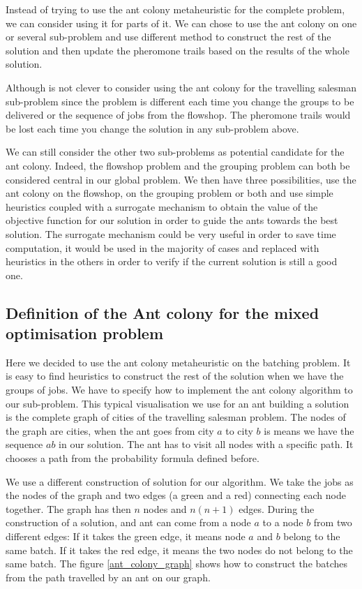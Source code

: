 \documentclass[UTF8, twoside]{EPURapport}
\begin{document}
	Instead of trying to use the ant colony metaheuristic for the complete problem, we can consider using it for parts of it. We can chose to use the ant colony on one or several sub-problem and use different method to construct the rest of the solution and then update the pheromone trails based on the results of the whole solution.
	
	Although is not clever to consider using the ant colony for the travelling salesman sub-problem since the problem is different each time you change the groups to be delivered or the sequence of jobs from the flowshop. The pheromone trails would be lost each time you change the solution in any sub-problem above.
	
	We can still consider the other two sub-problems as potential candidate for the ant colony. Indeed, the flowshop problem and the grouping problem can both be considered central in our global problem. We then have three possibilities, use the ant colony on the flowshop, on the grouping problem or both and use simple heuristics coupled with a surrogate mechanism to obtain the value of the objective function for our solution in order to guide the ants towards the best solution. The surrogate mechanism could be very useful in order to save time computation, it would be used in the majority of cases and replaced with heuristics in the others in order to verify if the current solution is still a good one.
\\	

\subsection{Definition of the Ant colony for the mixed optimisation problem}
	
	\hspace{4ex}Here we decided to use the ant colony metaheuristic on the batching problem. It is easy to find heuristics to construct the rest of the solution when we have the groups of jobs. We have to specify how to implement the ant colony algorithm to our sub-problem. This typical visualisation we use for an ant building a solution is the complete graph of cities of the travelling salesman problem. The nodes of the graph are cities, when the ant goes from city $a$ to city $b$ is means we have the sequence $ab$ in our solution. The ant has to visit all nodes with a specific path. It chooses a path from the probability formula defined before.
	
	We use a different construction of solution for our algorithm. We take the jobs as the nodes of the graph and two edges (a green and a red) connecting each node together. The graph has then $n$ nodes and $n(n+1)$ edges. During the construction of a solution, and ant can come from a node $a$ to a node $b$ from two different edges: If it takes the green edge, it means node $a$ and $b$ belong to the same batch. If it takes the red edge, it means the two nodes do not belong to the same batch. The figure \ref{ant_colony_graph} shows how to construct the batches from the path travelled by an ant on our graph.
\\
\end{document}
